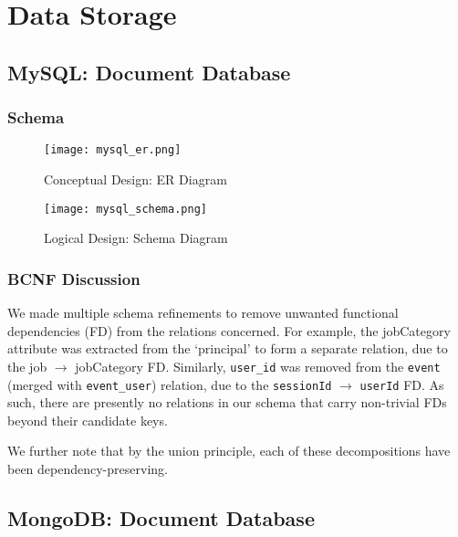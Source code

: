 \documentclass[10pt,titlepage]{article}
\begin{document}
\section{Data Storage}

\subsection{MySQL: Document Database}
\subsubsection{Schema}
\begin{figure}[H]
    \hspace*{-2cm}\texttt{[image: mysql\_er.png]}
    \caption{Conceptual Design: ER Diagram}
    \label{fig:mysql_er}
\end{figure}

\begin{center}
    \begin{figure}[H]
        \centering
        \hspace*{-2cm}\texttt{[image: mysql\_schema.png]}
        \caption{Logical Design: Schema Diagram}
        \label{fig:mysql_schema}
    \end{figure}
\end{center}

\subsubsection{BCNF Discussion}

We made multiple schema refinements to remove unwanted functional dependencies (FD) from the relations concerned. For
example, the jobCategory attribute was extracted from the ‘principal’ to form a separate relation, due to the job
$\rightarrow$ jobCategory FD. Similarly, \texttt{user\_id} was removed from the \texttt{event} (merged with
\texttt{event\_user}) relation, due to the \texttt{sessionId} $\rightarrow$ \texttt{userId} FD. As such, there are
presently no relations in our schema that carry non-trivial FDs beyond their candidate keys.

We further note that by the union principle, each of these decompositions have been dependency-preserving.

\pagebreak
\subsection{MongoDB: Document Database}
\end{document}
